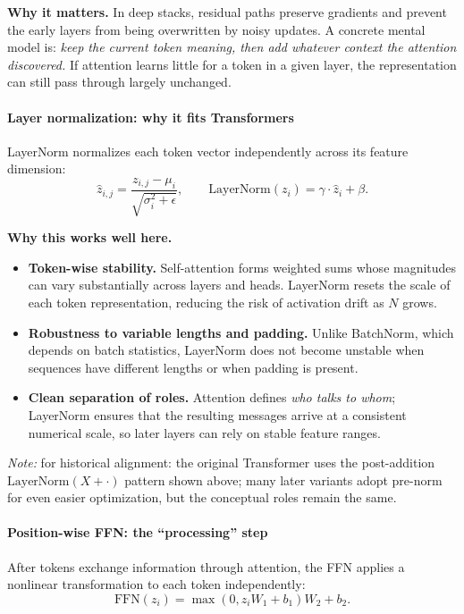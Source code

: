 \noindent
\textbf{Why it matters.}
In deep stacks, residual paths preserve gradients and prevent the early layers from being overwritten by noisy updates.
A concrete mental model is:
\emph{keep the current token meaning, then add whatever context the attention discovered.}
If attention learns little for a token in a given layer,
the representation can still pass through largely unchanged.

\paragraph{Layer normalization: why it fits Transformers}
\noindent
LayerNorm normalizes each token vector independently across its feature dimension:
\[
\hat{z}_{i,j} = \frac{z_{i,j}-\mu_i}{\sqrt{\sigma_i^2+\epsilon}},
\qquad
\text{LayerNorm}(z_i) = \gamma \cdot \hat{z}_i + \beta.
\]

\noindent
\textbf{Why this works well here.}
\begin{itemize}
	\item \textbf{Token-wise stability.}
	Self-attention forms weighted sums whose magnitudes can vary substantially across layers and heads.
	LayerNorm resets the scale of each token representation,
	reducing the risk of activation drift as \(N\) grows.
	
	\item \textbf{Robustness to variable lengths and padding.}
	Unlike BatchNorm, which depends on batch statistics,
	LayerNorm does not become unstable when sequences have different lengths
	or when padding is present.
	
	\item \textbf{Clean separation of roles.}
	Attention defines \emph{who talks to whom};
	LayerNorm ensures that the resulting messages arrive at a consistent numerical scale,
	so later layers can rely on stable feature ranges.
\end{itemize}

\noindent
\emph{Note:} for historical alignment: the original Transformer uses the post-addition
\(\text{LayerNorm}(X + \cdot)\) pattern shown above;
many later variants adopt pre-norm for even easier optimization,
but the conceptual roles remain the same.

\paragraph{Position-wise FFN: the ``processing'' step}
\noindent
After tokens exchange information through attention,
the FFN applies a nonlinear transformation to each token independently:
\[
\text{FFN}(z_i)
=
\max(0, z_iW_1 + b_1)W_2 + b_2.
\]

